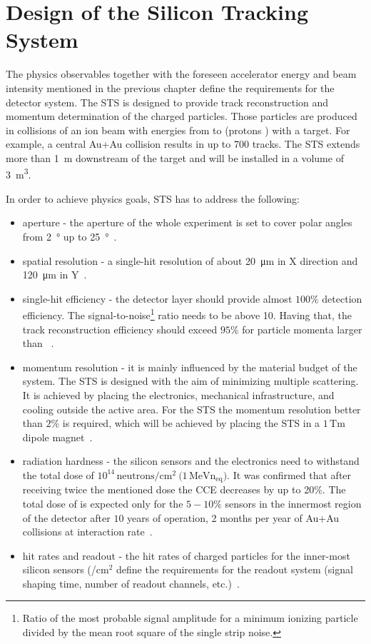 \section{Design of the Silicon Tracking System}
\label{STS}

The physics observables together with the foreseen accelerator energy and beam intensity mentioned in the previous chapter define the requirements for the detector system. The \gls{STS} is designed to provide track reconstruction and momentum determination of the charged particles. Those particles are produced in collisions of an ion beam with energies from  to  (protons ) with a target. For example, a central Au+Au collision results in up to 700 tracks. The \gls{STS} extends more than \SI{1}{\metre} downstream of the target and will be installed in a volume of \SI{3}{\cubic\metre}. 

In order to achieve physics goals, \gls{STS} has to address the following:
\begin{itemize}
    \item  aperture - the aperture of the whole experiment is set to cover polar angles from \SI{2}{\degree} up to \SI{25}{\degree}~\cite{Heuser:54798}.
    \item spatial resolution - a single-hit resolution of about \SI{20}{\micro\metre} in X direction and \SI{120}{\micro\metre} in Y~\cite{Heuser:54798}.
    \item single-hit efficiency - the detector layer should provide almost $100\%$ detection efficiency. The signal-to-noise\footnote{Ratio of the most probable signal amplitude for a minimum ionizing particle divided by the mean root square of the single strip noise.} ratio needs to be above 10. Having that, the track reconstruction efficiency should exceed $95\%$ for particle momenta larger than ~\cite{Heuser:54798}. 
    \item momentum resolution - it is mainly influenced by the material budget of the system. The \gls{STS} is designed with the aim of minimizing multiple scattering. It is achieved by placing the electronics, mechanical infrastructure, and cooling outside the active area. For the \gls{STS} the momentum resolution better than $2\%$ is required, which will be achieved by placing the \gls{STS} in a $1\,\mathrm{Tm}$ dipole magnet~\cite{Heuser:54798}.
    \item radiation hardness - the silicon sensors and the electronics need to withstand the total dose of $10^{14}\,\mathrm{neutrons/cm^{2}}~(1\,\mathrm{MeV n_{eq})}$. It was confirmed that after receiving twice the mentioned dose the CCE decreases by up to 20\%. The total dose of  is expected only for the $5 - 10\%$ sensors in the innermost region of the detector after $10$ years of operation, 2 months per year of  Au+Au collisions at  interaction rate~\cite{Heuser:54798}.
    \item hit rates and readout - the hit rates of charged particles for the inner-most silicon sensors (/$\mathrm{cm^{2}}$ define the requirements for the readout system (signal shaping time, number of readout channels, etc.)~\cite{Heuser:54798}.
\end{itemize}


